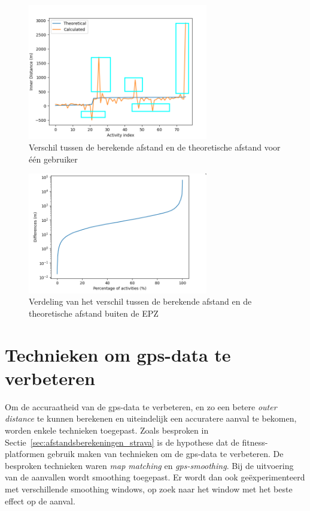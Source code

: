 \begin{figure}[h]
    \centering
    \includegraphics[width=0.7\textwidth]{fig/Afwijkingen&Analyses/Graphs/Verschil_Theoretische_innerDistance.png}
    \caption{Verschil tussen de berekende afstand en de theoretische afstand voor één gebruiker}\label{fig:difference_noCDF}
\end{figure}
\begin{figure}[h]
    \centering
    \includegraphics[width=0.7\textwidth]{fig/Afwijkingen&Analyses/Graphs/100_Differences_tov_theoretische_BefSmoothening.png}
    \caption{Verdeling van het verschil tussen de berekende afstand en de theoretische afstand buiten de \ac{EPZ} }\label{fig:differences_theoretical}
\end{figure}

\section{Technieken om gps-data te verbeteren}
Om de accuraatheid van de \ac{gps}-data te verbeteren, en zo een betere
\textit{outer distance} te kunnen berekenen en uiteindelijk een accuratere
aanval te bekomen, worden enkele technieken toegepast. Zoals besproken in
Sectie~\ref{sec:afstandsberekeningen_strava} is de hypothese dat de
fitness-platformen gebruik maken van technieken om de \ac{gps}-data te
verbeteren. De besproken technieken waren \textit{map matching} en
\textit{\ac{gps}-smoothing}. Bij de uitvoering van de aanvallen wordt smoothing
toegepast. Er wordt dan ook geëxperimenteerd met verschillende smoothing
windows, op zoek naar het window met het beste effect op de aanval.

